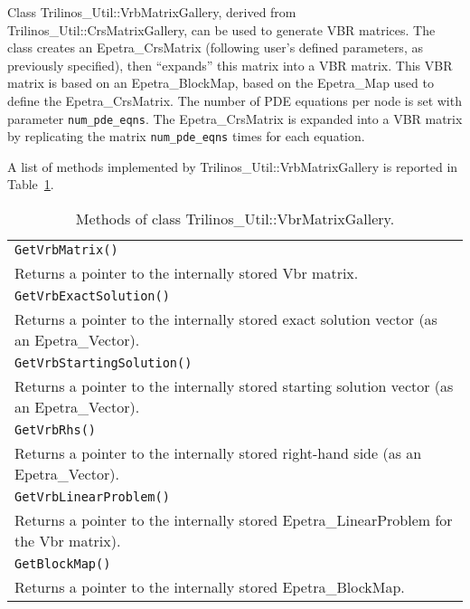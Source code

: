 \medskip

Class Trilinos\_Util::VrbMatrixGallery, derived from
Trilinos\_Util::CrsMatrixGallery, can be used to generate VBR matrices.
The class creates an Epetra\_CrsMatrix (following user's defined
parameters, as previously specified), then ``expands'' this matrix into
a VBR matrix. This VBR  matrix is based on an Epetra\_BlockMap, based on
the Epetra\_Map used to define the Epetra\_CrsMatrix. The number of PDE
equations per node is set with parameter \verb!num_pde_eqns!. The
Epetra\_CrsMatrix is expanded into a VBR matrix by replicating the
matrix \verb!num_pde_eqns! times for each equation.

A list of methods implemented by Trilinos\_Util::VrbMatrixGallery is
reported in Table~\ref{tab:triutils:vbr}.

\begin{table}[htbp]
  \centering
  \begin{tabular}{| p{14cm} |}
    \hline
    {\tt GetVrbMatrix()}\\
    {Returns a pointer to the internally
  stored Vbr matrix.} \\
\tt GetVrbExactSolution() \\
{Returns a pointer to the internally
  stored exact solution vector (as an Epetra\_Vector).} \\
{\tt GetVrbStartingSolution()} \\
 {Returns a pointer to the
  internally stored starting solution vector (as an Epetra\_Vector).} \\
{\tt GetVrbRhs()}  \\
 {Returns a pointer to the internally
  stored right-hand side (as an Epetra\_Vector).} \\
{\tt GetVrbLinearProblem()} \\
 {Returns a pointer to the internally
  stored  Epetra\_LinearProblem for the Vbr matrix).} \\
{\tt GetBlockMap()}\\
 {Returns a pointer to the internally
  stored Epetra\_BlockMap.} \\
    \hline
  \end{tabular}
  \caption{Methods of class Trilinos\_Util::VbrMatrixGallery.}
  \label{tab:triutils:vbr}
\end{table}

\medskip

